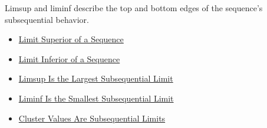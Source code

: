 \begin{remark*}[Interpretation]
Limsup and liminf describe the top and bottom edges of the sequence's
subsequential behavior.
\end{remark*}

\begin{remark*}[Dependencies]\hfill
\begin{itemize}
  \item \hyperref[def:limsup-sequence]{Limit Superior of a Sequence}
  \item \hyperref[def:liminf-sequence]{Limit Inferior of a Sequence}
  \item \hyperref[thm:limsup-largest-subsequential-limit]{Limsup Is the Largest Subsequential Limit}
  \item \hyperref[thm:liminf-smallest-subsequential-limit]{Liminf Is the Smallest Subsequential Limit}
  \item \hyperref[thm:cluster-values-are-subsequential-limits]{Cluster Values Are Subsequential Limits}
\end{itemize}
\end{remark*}